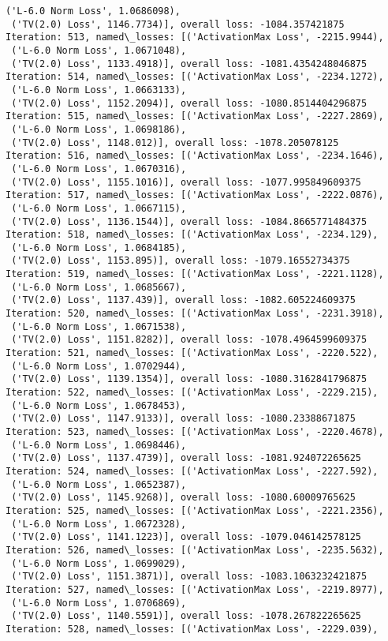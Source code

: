 \documentclass[10pt]{article}
\begin{document}
\begin{Verbatim}[commandchars=\\\{\}]
 ('L-6.0 Norm Loss', 1.0686098),
 ('TV(2.0) Loss', 1146.7734)], overall loss: -1084.357421875
Iteration: 513, named\_losses: [('ActivationMax Loss', -2215.9944),
 ('L-6.0 Norm Loss', 1.0671048),
 ('TV(2.0) Loss', 1133.4918)], overall loss: -1081.4354248046875
Iteration: 514, named\_losses: [('ActivationMax Loss', -2234.1272),
 ('L-6.0 Norm Loss', 1.0663133),
 ('TV(2.0) Loss', 1152.2094)], overall loss: -1080.8514404296875
Iteration: 515, named\_losses: [('ActivationMax Loss', -2227.2869),
 ('L-6.0 Norm Loss', 1.0698186),
 ('TV(2.0) Loss', 1148.012)], overall loss: -1078.205078125
Iteration: 516, named\_losses: [('ActivationMax Loss', -2234.1646),
 ('L-6.0 Norm Loss', 1.0670316),
 ('TV(2.0) Loss', 1155.1016)], overall loss: -1077.995849609375
Iteration: 517, named\_losses: [('ActivationMax Loss', -2222.0876),
 ('L-6.0 Norm Loss', 1.0667115),
 ('TV(2.0) Loss', 1136.1544)], overall loss: -1084.8665771484375
Iteration: 518, named\_losses: [('ActivationMax Loss', -2234.129),
 ('L-6.0 Norm Loss', 1.0684185),
 ('TV(2.0) Loss', 1153.895)], overall loss: -1079.16552734375
Iteration: 519, named\_losses: [('ActivationMax Loss', -2221.1128),
 ('L-6.0 Norm Loss', 1.0685667),
 ('TV(2.0) Loss', 1137.439)], overall loss: -1082.605224609375
Iteration: 520, named\_losses: [('ActivationMax Loss', -2231.3918),
 ('L-6.0 Norm Loss', 1.0671538),
 ('TV(2.0) Loss', 1151.8282)], overall loss: -1078.4964599609375
Iteration: 521, named\_losses: [('ActivationMax Loss', -2220.522),
 ('L-6.0 Norm Loss', 1.0702944),
 ('TV(2.0) Loss', 1139.1354)], overall loss: -1080.3162841796875
Iteration: 522, named\_losses: [('ActivationMax Loss', -2229.215),
 ('L-6.0 Norm Loss', 1.0678453),
 ('TV(2.0) Loss', 1147.9133)], overall loss: -1080.23388671875
Iteration: 523, named\_losses: [('ActivationMax Loss', -2220.4678),
 ('L-6.0 Norm Loss', 1.0698446),
 ('TV(2.0) Loss', 1137.4739)], overall loss: -1081.924072265625
Iteration: 524, named\_losses: [('ActivationMax Loss', -2227.592),
 ('L-6.0 Norm Loss', 1.0652387),
 ('TV(2.0) Loss', 1145.9268)], overall loss: -1080.60009765625
Iteration: 525, named\_losses: [('ActivationMax Loss', -2221.2356),
 ('L-6.0 Norm Loss', 1.0672328),
 ('TV(2.0) Loss', 1141.1223)], overall loss: -1079.046142578125
Iteration: 526, named\_losses: [('ActivationMax Loss', -2235.5632),
 ('L-6.0 Norm Loss', 1.0699029),
 ('TV(2.0) Loss', 1151.3871)], overall loss: -1083.1063232421875
Iteration: 527, named\_losses: [('ActivationMax Loss', -2219.8977),
 ('L-6.0 Norm Loss', 1.0706869),
 ('TV(2.0) Loss', 1140.5591)], overall loss: -1078.267822265625
Iteration: 528, named\_losses: [('ActivationMax Loss', -2229.039),

\end{Verbatim}
\end{document}
